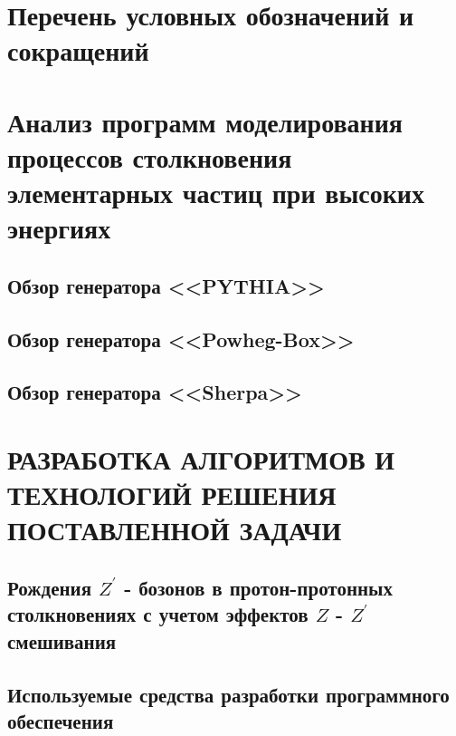 \documentclass[12pt,a4paper]{styles/report}
\begin{document}
	
\renewcommand\contentsname{СОДЕРЖАНИЕ}
\renewcommand{\bibname}{БИБЛИОГРАФИЧЕСКИЙ СПИСОК}
\renewcommand\chaptername{ГЛАВА}
\renewcommand\figurename{Рисунок}
\renewcommand\tablename{Таблица}



\newpage
\pagestyle{plain}  \setcounter{page}{2}
\large \tableofcontents

\newpage
\chapter*{Перечень условных обозначений и сокращений}






\chapter{Анализ программ моделирования процессов столкновения элементарных частиц при высоких энергиях}

\section{Обзор генератора <<PYTHIA>>}

\section{Обзор генератора <<Powheg-Box>>}

\section{Обзор генератора <<Sherpa>>}


\chapter{РАЗРАБОТКА АЛГОРИТМОВ И ТЕХНОЛОГИЙ РЕШЕНИЯ ПОСТАВЛЕННОЙ ЗАДАЧИ}
\section{Рождения $Z^\prime$ - бозонов в протон-протонных столкновениях с учетом эффектов $Z$ - $Z^\prime$ смешивания}


\section{Используемые средства разработки программного обеспечения}

\end{document}
